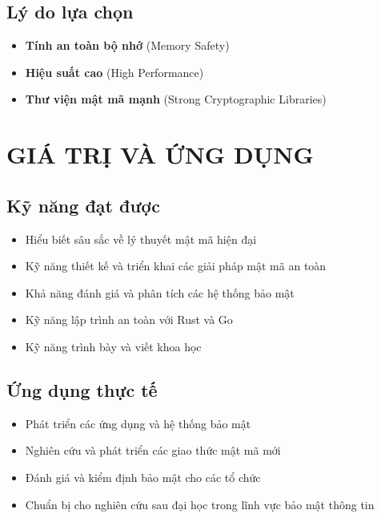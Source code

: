 \subsection{Lý do lựa chọn}
\begin{itemize}
\item \textbf{Tính an toàn bộ nhớ} (Memory Safety)
\item \textbf{Hiệu suất cao} (High Performance)
\item \textbf{Thư viện mật mã mạnh} (Strong Cryptographic Libraries)
\end{itemize}

\section{GIÁ TRỊ VÀ ỨNG DỤNG}

\subsection{Kỹ năng đạt được}
\begin{itemize}
\item Hiểu biết sâu sắc về lý thuyết mật mã hiện đại
\item Kỹ năng thiết kế và triển khai các giải pháp mật mã an toàn
\item Khả năng đánh giá và phân tích các hệ thống bảo mật
\item Kỹ năng lập trình an toàn với Rust và Go
\item Kỹ năng trình bày và viết khoa học
\end{itemize}

\subsection{Ứng dụng thực tế}
\begin{itemize}
\item Phát triển các ứng dụng và hệ thống bảo mật
\item Nghiên cứu và phát triển các giao thức mật mã mới
\item Đánh giá và kiểm định bảo mật cho các tổ chức
\item Chuẩn bị cho nghiên cứu sau đại học trong lĩnh vực bảo mật thông tin
\end{itemize}